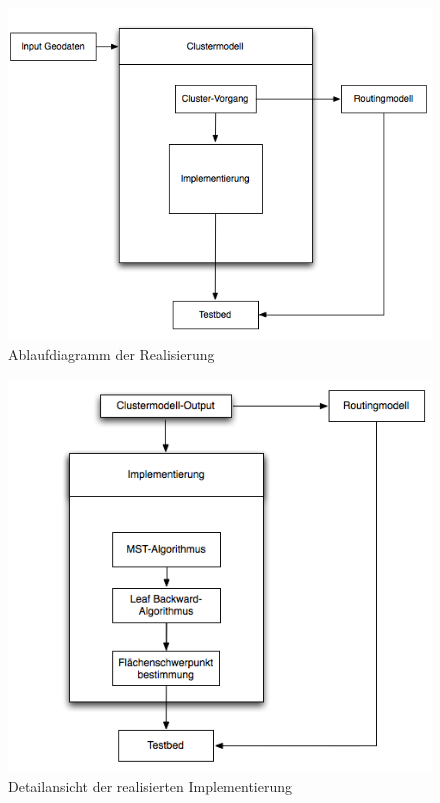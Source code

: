 \begin{figure}[H]
    \centerline{\includegraphics[scale=0.5]{pics/diagrammRealisierung}}
    \caption[Ablaufdiagramm der Realisierung]{\label{FiG:Ablaufdiagramm der Realisierung} Ablaufdiagramm der Realisierung}
\end{figure}

       
\begin{figure}[H]
    \centerline{\includegraphics[scale=0.7]{pics/diagrammRealisierungDetail}}
    \caption[Ablaufdiagramm-Detail der Realisierung]{\label{FiG:Ablaufdiagramm-Detail der Realisierung} Detailansicht der realisierten Implementierung}
\end{figure}
       
